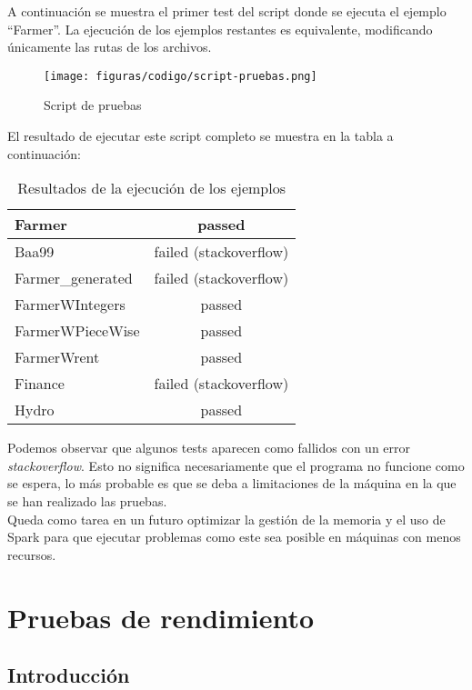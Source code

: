 A continuación se muestra el primer test del script donde se ejecuta el ejemplo ``Farmer''. La ejecución de los ejemplos restantes es equivalente, modificando únicamente las rutas de los archivos.\\

\begin{figure}[H]
    \centerline{\texttt{[image: figuras/codigo/script-pruebas.png]}}
    \caption{Script de pruebas}
\end{figure}

El resultado de ejecutar este script completo se muestra en la tabla a continuación: \\

\begin{table} [H]
    \begin{tabularx}{\linewidth}{|X|c|}
        \hline
        Farmer & passed \tabularnewline
        \hline
        Baa99 & failed (stackoverflow) \tabularnewline
        \hline
        Farmer\_generated & failed (stackoverflow) \tabularnewline
        \hline
        FarmerWIntegers & passed \tabularnewline
        \hline
        FarmerWPieceWise & passed \tabularnewline
        \hline
        FarmerWrent & passed \tabularnewline
        \hline
        Finance & failed (stackoverflow) \tabularnewline
        \hline
        Hydro & passed \tabularnewline
        \hline
    \end{tabularx}
    \caption{Resultados de la ejecución de los ejemplos}
    \label{tab:test-examples}
\end{table}

Podemos observar que algunos tests aparecen como fallidos con un error \textit{stackoverflow}. Esto no significa necesariamente que el programa no funcione como se espera, lo más probable es que se deba a limitaciones de la máquina en la que se han realizado las pruebas.\\

Queda como tarea en un futuro optimizar la gestión de la memoria y el uso de Spark para que ejecutar problemas como este sea posible en máquinas con menos recursos. 

\section{Pruebas de rendimiento}

\subsection{Introducción}

